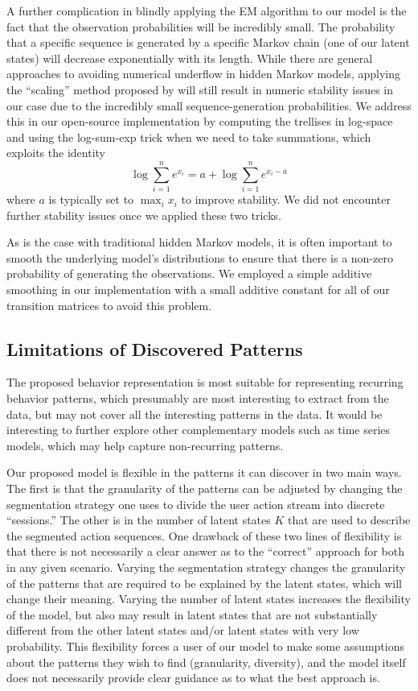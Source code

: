 A further complication in blindly applying the EM algorithm to our model is
the fact that the observation probabilities will be incredibly small. The
probability that a specific sequence is generated by a specific Markov
chain (one of our latent states) will decrease exponentially with its
length. While there are general approaches to avoiding numerical underflow
in hidden Markov models, applying the ``scaling'' method proposed by
\citet{Rabiner:1990:RSR} will still result in numeric stability issues in
our case due to the incredibly small sequence-generation probabilities. We
address this in our open-source implementation by computing the trellises
in log-space and using the log-sum-exp trick when we need to take
summations, which exploits the identity
\begin{equation}
    \log \sum_{i=1}^n e^{x_i} = a + \log \sum_{i=1}^n e^{x_i - a}
\end{equation}
where $a$ is typically set to $\max_i x_i$ to improve stability. We did not
encounter further stability issues once we applied these two tricks.

As is the case with traditional hidden Markov models, it is often important
to smooth the underlying model's distributions to ensure that there is a
non-zero probability of generating the observations. We employed a simple
additive smoothing in our implementation with a small additive constant for
all of our transition matrices to avoid this problem.

\subsection{Limitations of Discovered Patterns}

The proposed behavior representation is most suitable for representing
recurring behavior patterns, which presumably are most interesting
to extract from the data, but may not cover all the interesting patterns in the data.
It would be interesting to further explore other complementary models such as
 time series models, which may help capture non-recurring patterns.

Our proposed model is flexible in the patterns it can discover in two main
ways. The first is that the granularity of the patterns can be adjusted by
changing the segmentation strategy one uses to divide the user action
stream into discrete ``sessions.'' The other is in the number of latent
states $K$ that are used to describe the segmented action sequences. One
drawback of these two lines of flexibility is that there is not necessarily
a clear answer as to the ``correct'' approach for both in any given
scenario. Varying the segmentation strategy changes the granularity of the
patterns that are required to be explained by the latent states, which will
change their meaning. Varying the number of latent states increases the
flexibility of the model, but also may result in latent states that are not
substantially different from the other latent states and/or latent states
with very low probability. This flexibility forces a user of our model to
make some assumptions about the patterns they wish to find (granularity,
diversity), and the model itself does not necessarily provide clear
guidance as to what the best approach is.

